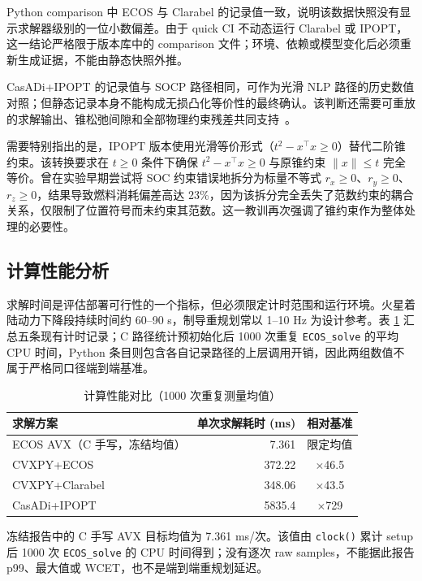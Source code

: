 Python comparison 中 ECOS 与 Clarabel 的记录值一致，说明该数据快照没有显示求解器级别的一位小数偏差。由于 quick CI 不动态运行 Clarabel 或 IPOPT，这一结论严格限于版本库中的 comparison 文件；环境、依赖或模型变化后必须重新生成证据，不能由静态快照外推。

CasADi+IPOPT 的记录值与 SOCP 路径相同，可作为光滑 NLP 路径的历史数值对照；但静态记录本身不能构成无损凸化等价性的最终确认。该判断还需要可重放的求解输出、锥松弛间隙和全部物理约束残差共同支持~\cite{acikmese2013}。

需要特别指出的是，IPOPT 版本使用光滑等价形式（$t^2 - x^\top x \geq 0$）替代二阶锥约束。该转换要求在 $t \geq 0$ 条件下确保 $t^2 - x^\top x \geq 0$ 与原锥约束 $\|x\|\leq t$ 完全等价。曾在实验早期尝试将 SOC 约束错误地拆分为标量不等式 $r_x \geq 0$、$r_y \geq 0$、$r_z \geq 0$，结果导致燃料消耗偏差高达 23\%，因为该拆分完全丢失了范数约束的耦合关系，仅限制了位置符号而未约束其范数。这一教训再次强调了锥约束作为整体处理的必要性。

\subsection{计算性能分析}

求解时间是评估部署可行性的一个指标，但必须限定计时范围和运行环境。火星着陆动力下降段持续时间约 60--90 s，制导重规划常以 1--10 Hz 为设计参考。表 \ref{tab:performance} 汇总五条现有计时记录；C 路径统计预初始化后 1000 次重复 \texttt{ECOS\_solve} 的平均 CPU 时间，Python 条目则包含各自记录路径的上层调用开销，因此两组数值不属于严格同口径端到端基准。

\begin{table}[tbp]
\centering
\caption{计算性能对比（1000 次重复测量均值）}
\label{tab:performance}
\begin{tabular}{lrc}
\toprule
求解方案 & 单次求解耗时 (ms) & 相对基准 \\
\midrule
ECOS AVX（C 手写，冻结均值） & 7.361 & 限定均值 \\
CVXPY+ECOS & 372.22 & $\times$46.5 \\
CVXPY+Clarabel & 348.06 & $\times$43.5 \\
CasADi+IPOPT & 5835.4 & $\times$729 \\
\bottomrule
\end{tabular}
\end{table}

冻结报告中的 C 手写 AVX 目标均值为 7.361 ms/次。该值由 \texttt{clock()} 累计 setup 后 1000 次 \texttt{ECOS\_solve} 的 CPU 时间得到；没有逐次 raw samples，不能据此报告 p99、最大值或 WCET，也不是端到端重规划延迟。

